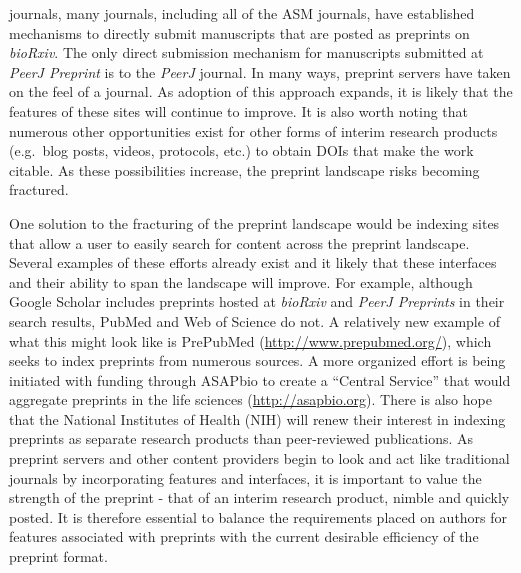 \documentclass[11pt,]{article}
\begin{document}
journals, many journals, including all of the ASM journals, have
established mechanisms to directly submit manuscripts that are posted as
preprints on \emph{bioRxiv}. The only direct submission mechanism for
manuscripts submitted at \emph{PeerJ Preprint} is to the \emph{PeerJ}
journal. In many ways, preprint servers have taken on the feel of a
journal. As adoption of this approach expands, it is likely that the
features of these sites will continue to improve. It is also worth
noting that numerous other opportunities exist for other forms of
interim research products (e.g.~blog posts, videos, protocols, etc.) to
obtain DOIs that make the work citable. As these possibilities increase,
the preprint landscape risks becoming fractured.

One solution to the fracturing of the preprint landscape would be
indexing sites that allow a user to easily search for content across the
preprint landscape. Several examples of these efforts already exist and
it likely that these interfaces and their ability to span the landscape
will improve. For example, although Google Scholar includes preprints
hosted at \emph{bioRxiv} and \emph{PeerJ Preprints} in their search
results, PubMed and Web of Science do not. A relatively new example of
what this might look like is PrePubMed
(\url{http://www.prepubmed.org/}), which seeks to index preprints from
numerous sources. A more organized effort is being initiated with
funding through ASAPbio to create a ``Central Service'' that would
aggregate preprints in the life sciences (\url{http://asapbio.org}).
There is also hope that the National Institutes of Health (NIH) will
renew their interest in indexing preprints as separate research products
than peer-reviewed publications. As preprint servers and other content
providers begin to look and act like traditional journals by
incorporating features and interfaces, it is important to value the
strength of the preprint - that of an interim research product, nimble
and quickly posted. It is therefore essential to balance the
requirements placed on authors for features associated with preprints
with the current desirable efficiency of the preprint format.
\end{document}
